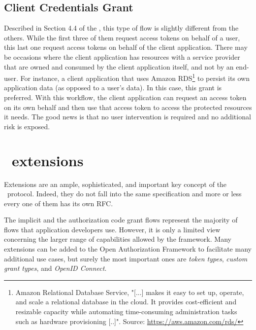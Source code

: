 \subsection{Client Credentials Grant}
Described in Section 4.4 of the , this type of flow is slightly different from the others. While the first three of them request access tokens on behalf of a user, this last one request access tokens on behalf of the client application. There may be occasions where the client application has resources with a service provider that are owned and consumed by the client application itself, and not by an end-user. For instance, a client application that uses Amazon RDS\footnote{Amazon Relational Database Service, "[...] makes it easy to set up, operate, and scale a relational database in the cloud. It provides cost-efficient and resizable capacity while automating time-consuming administration tasks such as hardware provisioning [..]". Source: \url{https://aws.amazon.com/rds/}} to persist its own application data (as opposed to a user's data). In this case, this grant is preferred. With this workflow, the client application can request an access token on its own behalf and then use that access token to access the protected resources it needs. The good news is that no user intervention is required and no additional risk is exposed.

\section{\oauth\ extensions}
Extensions are an ample, sophisticated, and important key concept of the \oauth\ protocol. Indeed, they do not fall into the same specification and more or less every one of them has its own RFC.

The implicit and the authorization code grant flows represent the majority of flows that application developers use. However, it is only a limited view concerning the larger range of capabilities allowed by the framework. Many extensions can be added to the Open Authorization Framework to facilitate many additional use cases, but surely the most important ones are \textit{token types}, \textit{custom grant types}, and \textit{OpenID Connect}.

